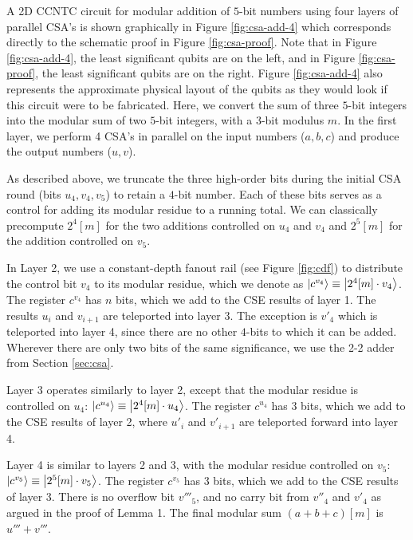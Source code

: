 \documentclass[twoside]{article}
\begin{document}
A \textsc{2D CCNTC} circuit for modular addition of $5$-bit numbers using
four layers of parallel CSA's is shown graphically in Figure \ref{fig:csa-add-4}
which corresponds directly to the schematic proof in Figure \ref{fig:csa-proof}.
Note that in Figure \ref{fig:csa-add-4}, the least significant qubits are
on the left, and in Figure \ref{fig:csa-proof}, the least significant qubits are
on the right.
Figure \ref{fig:csa-add-4} also represents the approximate
physical layout of the qubits as they would look if this
circuit were to be fabricated.
Here, we convert the sum of three
$5$-bit integers into the modular sum of two $5$-bit integers, with a
$3$-bit modulus $m$.
In the first layer,
we perform 4 CSA's in parallel on the input numbers ($a,b,c$) and produce the
output numbers ($u, v$).

As described above, we truncate
the three high-order bits during the initial CSA round
(bits $u_4, v_4, v_5$) to retain a $4$-bit number.
Each of these bits serves as a control for adding its modular residue to
a running total. We can classically precompute $2^4[m]$ for the two
additions controlled on $u_4$ and $v_4$ and
$2^5[m]$ for the addition controlled on $v_5$.

In Layer 2,
we use a constant-depth fanout rail (see Figure \ref{fig:cdf}) to
distribute the control bit $v_4$ to its modular residue, which we denote as
$\left\vert{c^{v_4}}\right\rangle \equiv \left\vert{2^4[m]\cdot v_4}\right\rangle$.
The register $c^{v_4}$ has $n$ bits, which we add to the CSE results of layer 1.
The results $u_i$ and $v_{i+1}$ are teleported into layer 3. The exception is
$v'_4$ which is teleported into layer 4, since there are no other $4$-bits
to which it can be added. Wherever there are only
two bits of the same significance, we use the 2-2 adder from
Section \ref{sec:csa}.

Layer 3
operates similarly to layer 2, except that the modular residue is controlled on
$u_4$:
$\left\vert{c^{u_4}}\right\rangle \equiv \left\vert{2^4[m] \cdot u_4}\right\rangle$.
The register $c^{u_4}$ has $3$ bits, which we
add to the CSE results of layer 2, where $u'_i$ and $v'_{i+1}$ are teleported
forward into layer 4.

Layer 4
is similar to layers 2 and 3, with the modular residue controlled on $v_5$:
$\left\vert{c^{v_5}}\right\rangle \equiv \left\vert{2^5[m] \cdot v_5}\right\rangle$.
The register $c^{v_5}$ has $3$ bits, which we
add to the CSE results of layer 3.
There is no overflow bit $v'''_5$, and no carry bit from $v''_4$ and $v'_4$
as argued in the proof of Lemma 1.
The final modular sum $(a+b+c)[m]$ is $u'''+v'''$.
\end{document}
